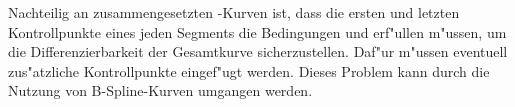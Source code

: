 Nachteilig an zusammengesetzten \bez-Kurven ist, dass die ersten und letzten 
Kontrollpunkte eines jeden Segments die Bedingungen 
 und  erf"ullen 
m"ussen, um die Differenzierbarkeit der Gesamtkurve sicherzustellen. Daf"ur 
m"ussen eventuell zus"atzliche Kontrollpunkte eingef"ugt werden. Dieses 
Problem kann durch die Nutzung von B-Spline-Kurven umgangen werden.

